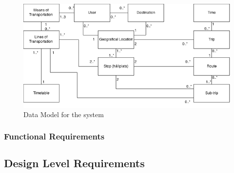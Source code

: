 \documentclass[a4paper]{article}
\begin{document}
			
			
				\begin{figure}[h]
					\includegraphics[scale=0.50]{img/datamodel-v2.png}
					\caption{Data Model for the system}
				\end{figure}
			
			
			\pagebreak
			\subsubsection{Functional Requirements}
				
		
					
				
		\subsection{Design Level Requirements}
		
\end{document}
